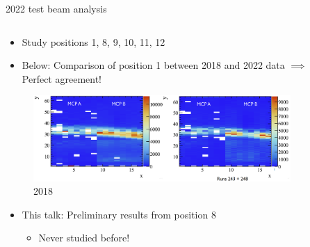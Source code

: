 \documentclass[xcolor={dvipsnames}]{beamer}
\begin{document}
\begin{frame}{2022 test beam analysis}
  \begin{columns}
    \begin{column}{0.7\textwidth}
      \begin{itemize}
        \setlength\itemsep{1.0em}
        \item{Study positions 1, 8, 9, 10, 11, 12}
        \item{Below: Comparison of position 1 between 2018 and 2022 data $\implies$ Perfect agreement!}
      \end{itemize}
      \vspace{-0.3cm}
      \begin{figure}
        \centering
        \caption*{2018\qquad\qquad\qquad\qquad\qquad{}}
        \includegraphics[width = 1.0\textwidth]{Figs/TORCH_testbeam_2018_2022_comparison.png}
      \end{figure}
      \begin{itemize}
        \item{This talk: Preliminary results from position 8}
        \begin{itemize}
          \item{Never studied before!}
        \end{itemize}
      \end{itemize}
    \end{column}
    \begin{column}{0.3\textwidth}
      \begin{figure}
        \centering

\end{figure}
\end{column}
\end{columns}
\end{frame}
\end{document}
